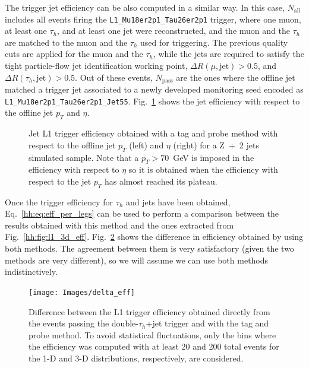 \documentclass[../main.tex]{subfiles}
\begin{document}
The trigger jet efficiency can be also computed in a similar way. In this case, $N_\text{all}$ includes all events firing the \texttt{L1\_Mu18er2p1\_Tau26er2p1} trigger, where one muon, at least one $\tau_h$, and at least one jet were reconstructed, and the muon and the $\tau_h$ are matched to the muon and the $\tau_h$ used for triggering. The previous quality cuts are applied for the muon and the $\tau_h$, while the jets are required to satisfy the tight particle-flow jet identification working point, $\Delta R(\mu, \text{jet}) > 0.5$, and $\Delta R(\tau_h, \text{jet}) > 0.5$. Out of these events, $N_\text{pass}$ are the ones where the offline jet matched a trigger jet associated to a newly developed monitoring seed encoded as \texttt{L1\_Mu18er2p1\_Tau26er2p1\_Jet55}. Fig.~\ref{hh:fig:l1_eff_jetleg} shows the jet efficiency with respect to the offline jet $p_T$ and $\eta$.

\begin{figure}[h!]
\begin{center}
\end{center}
\caption{Jet L1 trigger efficiency obtained with a tag and probe method with respect to the offline jet $p_T$ (left) and $\eta$ (right) for a Z~+~2 jets simulated sample. Note that a $p_T>70$~GeV is imposed in the efficiency with respect to $\eta$ so it is obtained when the efficiency with respect to the jet $p_T$ has almost reached its plateau. }
\label{hh:fig:l1_eff_jetleg}
\end{figure}

Once the trigger efficiency for $\tau_h$ and jets have been obtained, Eq.~\eqref{hh:eq:eff_per_legs} can be used to perform a comparison between the results obtained with this method and the ones extracted from Fig.~\ref{hh:fig:l1_3d_eff}. Fig.~\ref{hh:fig:l1_delta_eff} shows the difference in efficiency obtained by using both methods. The agreement between them is very satisfactory (given the two methods are very different), so we will assume we can use both methods indistinctively.

\begin{figure}[h!]
\begin{center}
\texttt{[image: Images/delta\_eff]}
\end{center}
\caption{Difference between the L1 trigger efficiency obtained directly from the events passing the double-$\tau_h$+jet trigger and with the tag and probe method. To avoid statistical fluctuations, only the bins where the efficiency was computed with at least 20 and 200 total events for the 1-D and 3-D distributions, respectively, are considered.}
\label{hh:fig:l1_delta_eff}
\end{figure}
\end{document}
